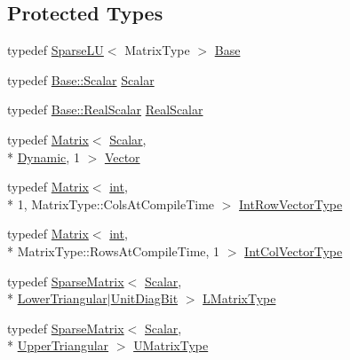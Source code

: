 \subsection*{Protected Types}
\begin{DoxyCompactItemize}
\item 
typedef \hyperlink{class_sparse_l_u}{Sparse\-L\-U}$<$ Matrix\-Type $>$ \hyperlink{class_sparse_l_u_3_01_matrix_type_00_01_umf_pack_01_4_afbbcbc7752cbd01b9298422e8751598a}{Base}
\item 
typedef \hyperlink{class_sparse_l_u_a1c13b088bd115436caa27f0f8f0c26fd}{Base\-::\-Scalar} \hyperlink{class_sparse_l_u_3_01_matrix_type_00_01_umf_pack_01_4_a69ffb45b1807211005457e8f787ccb45}{Scalar}
\item 
typedef \hyperlink{class_sparse_l_u_a1090bc6ec27ebb0b088f6a1bf2ad6eab}{Base\-::\-Real\-Scalar} \hyperlink{class_sparse_l_u_3_01_matrix_type_00_01_umf_pack_01_4_aba7325df91db6de407bfe82b22d97c71}{Real\-Scalar}
\item 
typedef \hyperlink{class_matrix}{Matrix}$<$ \hyperlink{class_sparse_l_u_3_01_matrix_type_00_01_umf_pack_01_4_a69ffb45b1807211005457e8f787ccb45}{Scalar}, \\*
\hyperlink{_constants_8h_adc9da5be31bdce40c25a92c27999c0e3}{Dynamic}, 1 $>$ \hyperlink{class_sparse_l_u_3_01_matrix_type_00_01_umf_pack_01_4_adbf917e2dc33be7373d5f3e829d56730}{Vector}
\item 
typedef \hyperlink{class_matrix}{Matrix}$<$ \hyperlink{ioapi_8h_a787fa3cf048117ba7123753c1e74fcd6}{int}, \\*
1, Matrix\-Type\-::\-Cols\-At\-Compile\-Time $>$ \hyperlink{class_sparse_l_u_3_01_matrix_type_00_01_umf_pack_01_4_ad6789d8ef818adc250479ca6b0d7f340}{Int\-Row\-Vector\-Type}
\item 
typedef \hyperlink{class_matrix}{Matrix}$<$ \hyperlink{ioapi_8h_a787fa3cf048117ba7123753c1e74fcd6}{int}, \\*
Matrix\-Type\-::\-Rows\-At\-Compile\-Time, 1 $>$ \hyperlink{class_sparse_l_u_3_01_matrix_type_00_01_umf_pack_01_4_af06161423c3dde25ec3431a7e87b66e8}{Int\-Col\-Vector\-Type}
\item 
typedef \hyperlink{class_sparse_matrix}{Sparse\-Matrix}$<$ \hyperlink{class_sparse_l_u_3_01_matrix_type_00_01_umf_pack_01_4_a69ffb45b1807211005457e8f787ccb45}{Scalar}, \\*
\hyperlink{_constants_8h_a9c6e15884c02c8075e3575670fe06894}{Lower\-Triangular}$|$\hyperlink{group__flags_ga254555b50eae5fa8a8d241f6bc08939a}{Unit\-Diag\-Bit} $>$ \hyperlink{class_sparse_l_u_3_01_matrix_type_00_01_umf_pack_01_4_a2900542d2fe0efa2c2d858cd9ca9953f}{L\-Matrix\-Type}
\item 
typedef \hyperlink{class_sparse_matrix}{Sparse\-Matrix}$<$ \hyperlink{class_sparse_l_u_3_01_matrix_type_00_01_umf_pack_01_4_a69ffb45b1807211005457e8f787ccb45}{Scalar}, \\*
\hyperlink{_constants_8h_a96ca999d353b2e4ed0976aab836d047a}{Upper\-Triangular} $>$ \hyperlink{class_sparse_l_u_3_01_matrix_type_00_01_umf_pack_01_4_a22232647515b18b74cd7c1dadc5d85df}{U\-Matrix\-Type}
\end{DoxyCompactItemize}
